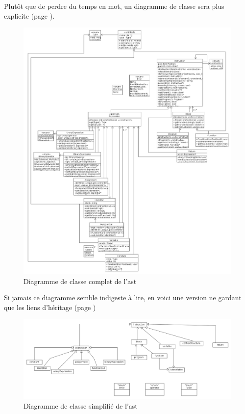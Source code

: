 \documentclass{report}
\begin{document}
Plutôt que de perdre du temps en mot, un diagramme de classe sera plus explicite (page \pageref{fig:BigAST}).
\begin{figure}[!hbt]\begin{center}
\includegraphics[width=\textwidth]{../ast_class_diagram.png}
\caption{Diagramme de classe complet de l'ast}
\label{fig:BigAST}
\end{center}\end{figure}

Si jamais ce diagramme semble indigeste à lire, en voici une version ne gardant que les liens d'héritage (page \pageref{fig:SmallAST})
\begin{figure}\begin{center}
\includegraphics[width=\textwidth]{../diagramme_heritage.png} 
\caption{Diagramme de classe simplifié de l'ast}
\label{fig:SmallAST}
\end{center}\end{figure}
\end{document}
